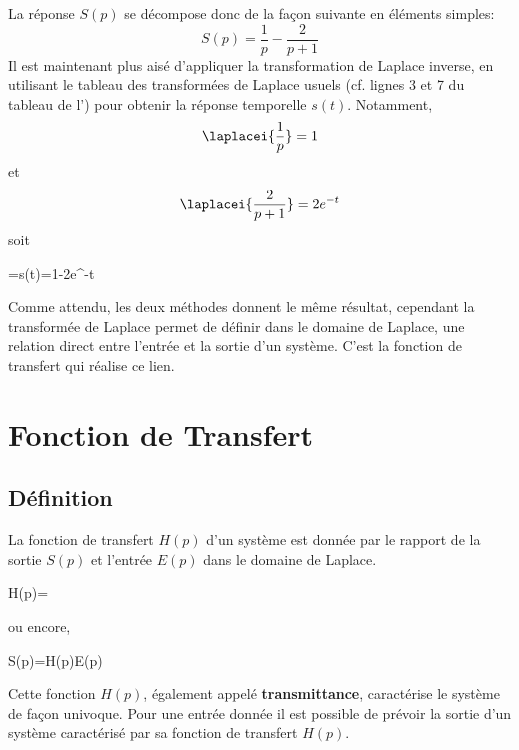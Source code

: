 La réponse $S(p)$ se décompose donc de la façon suivante en éléments simples:
\[
    S(p)=\dfrac{1}{p}-\dfrac{2}{p+1}
\]
Il est maintenant plus aisé d'appliquer la transformation de Laplace inverse, 
en utilisant le tableau des transformées de Laplace usuels 
(cf. lignes 3 et 7 du tableau de l') pour obtenir la 
réponse temporelle $s(t)$. Notamment,
\[
    \laplacei{\dfrac{1}{p}}=1
\]
et
\[
    \laplacei{\dfrac{2}{p+1}}=2e^{-t}
\]
soit 
\begin{bequation}
    =s(t)=1-2e^{-t}
\end{bequation}
Comme attendu, les deux méthodes donnent le même résultat, cependant 
la transformée de Laplace permet de définir dans le domaine de Laplace, une 
relation direct entre l'entrée et la sortie d'un système. C'est la fonction 
de transfert qui réalise ce lien.
\clearpage
\section{Fonction de Transfert}
\subsection{Définition}
La fonction de transfert $H(p)$ d'un système est donnée par le rapport de la 
sortie $S(p)$ et l'entrée $E(p)$ dans le domaine de Laplace. 
\begin{bequation}
    H(p)=
\end{bequation}
ou encore,
\begin{bequation}
    S(p)=H(p)E(p)\label{eq-she}
\end{bequation}
Cette fonction $H(p)$, également appelé \textbf{transmittance}, caractérise 
le système de façon univoque. Pour une entrée donnée il est possible de 
prévoir la sortie d'un système caractérisé par sa fonction de transfert $H(p)$.

